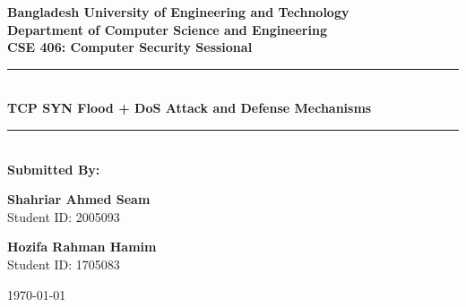 \documentclass[11pt,a4paper]{report}
\begin{document}
\begin{titlepage}
    \centering
    \vspace*{1.5cm}
    
    {\Large \textbf{Bangladesh University of Engineering and Technology}}\\[0.35cm]
    {\large \textbf{Department of Computer Science and Engineering}}\\[2.2cm]
    
    {\Large \textbf{CSE 406: Computer Security Sessional}}\\[2.2cm]
    
    \rule{\linewidth}{0.5mm}\\[0.7cm]
    {\Large \bfseries TCP SYN Flood + DoS Attack and Defense Mechanisms}\\[0.7cm]
    \rule{\linewidth}{0.5mm}\\[2.5cm]
    
    {\large \textbf{Submitted By:}}\\[0.8cm]
    \begin{minipage}{0.45\textwidth}
        \centering \large
        \textbf{Shahriar Ahmed Seam}\\[0.15cm]
        Student ID: 2005093
    \end{minipage}
    \hfill
    \begin{minipage}{0.45\textwidth}
        \centering \large
        \textbf{Hozifa Rahman Hamim}\\[0.15cm]
        Student ID: 1705083
    \end{minipage}
    
    \vfill
    {\large \today}\\[0.8cm]
\end{titlepage}

\end{document}
